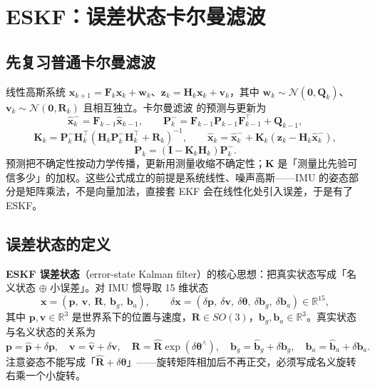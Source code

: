 \section{ESKF：误差状态卡尔曼滤波}\label{sec:06-eskf}

\subsection{先复习普通卡尔曼滤波}

线性高斯系统 $\bm{x}_{k+1}=\bm{F}_k\bm{x}_k+\bm{w}_k$、$\bm{z}_k=\bm{H}_k\bm{x}_k+\bm{v}_k$，其中 $\bm{w}_k\sim\mathcal{N}(\bm{0},\bm{Q}_k)$、$\bm{v}_k\sim\mathcal{N}(\bm{0},\bm{R}_k)$ 且相互独立。卡尔曼滤波 \cite{kalman1960} 的预测与更新为
\begin{equation}
  \hat{\bm{x}}_k^{-}=\bm{F}_{k-1}\hat{\bm{x}}_{k-1},
  \qquad
  \bm{P}_k^{-}=\bm{F}_{k-1}\bm{P}_{k-1}\bm{F}_{k-1}^{\top}+\bm{Q}_{k-1},
  \label{eq:06-kf-predict}
\end{equation}
\begin{equation}
  \bm{K}_k=\bm{P}_k^{-}\bm{H}_k^{\top}\left(\bm{H}_k\bm{P}_k^{-}\bm{H}_k^{\top}+\bm{R}_k\right)^{-1},
  \qquad
  \hat{\bm{x}}_k=\hat{\bm{x}}_k^{-}+\bm{K}_k\left(\bm{z}_k-\bm{H}_k\hat{\bm{x}}_k^{-}\right),
  \label{eq:06-kf-update}
\end{equation}
\begin{equation}
  \bm{P}_k=\left(\bm{I}-\bm{K}_k\bm{H}_k\right)\bm{P}_k^{-}.
  \label{eq:06-kf-cov}
\end{equation}
预测把不确定性按动力学传播，更新用测量收缩不确定性；$\bm{K}$ 是「测量比先验可信多少」的加权。这些公式成立的前提是系统线性、噪声高斯——IMU 的姿态部分是矩阵乘法，不是向量加法，直接套 EKF 会在线性化处引入误差，于是有了 ESKF。

\subsection{误差状态的定义}

\textbf{ESKF 误差状态}（error-state Kalman filter）的核心思想：把真实状态写成「名义状态 $\oplus$ 小误差」。对 IMU 惯导取 15 维状态
\begin{equation}
  \bm{x} = \left(\bm{p},\ \bm{v},\ \bm{R},\ \bm{b}_g,\ \bm{b}_a\right),
  \qquad
  \delta\bm{x} = \left(\delta\bm{p},\ \delta\bm{v},\ \delta\bm{\theta},\ \delta\bm{b}_g,\ \delta\bm{b}_a\right)\in\mathbb{R}^{15},
  \label{eq:06-state}
\end{equation}
其中 $\bm{p},\bm{v}\in\mathbb{R}^{3}$ 是世界系下的位置与速度，$\bm{R}\in SO(3)$，$\bm{b}_g,\bm{b}_a\in\mathbb{R}^{3}$。真实状态与名义状态的关系为
\begin{equation}
  \bm{p}=\hat{\bm{p}}+\delta\bm{p},\quad
  \bm{v}=\hat{\bm{v}}+\delta\bm{v},\quad
  \bm{R}=\hat{\bm{R}}\exp\left(\delta\bm{\theta}^{\wedge}\right),\quad
  \bm{b}_g=\hat{\bm{b}}_g+\delta\bm{b}_g,\quad
  \bm{b}_a=\hat{\bm{b}}_a+\delta\bm{b}_a.
  \label{eq:06-error-def}
\end{equation}
注意姿态不能写成「$\hat{\bm{R}}+\delta\bm{\theta}$」——旋转矩阵相加后不再正交，必须写成名义旋转右乘一个小旋转。

